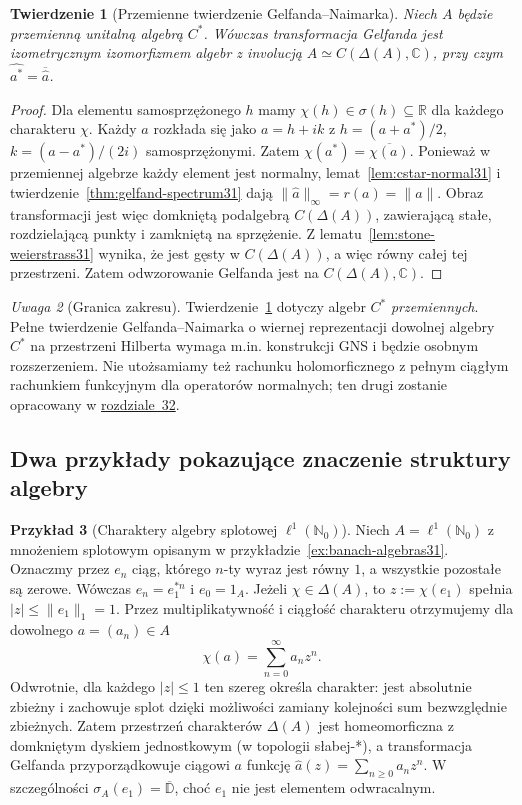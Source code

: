 \documentclass[11pt,a4paper]{article}
\numberwithin{equation}{section}
\theoremstyle{plain}
\newtheorem{twierdzenie}{Twierdzenie}[section]
\theoremstyle{definition}
\newtheorem{przyklad}[twierdzenie]{Przykład}
\theoremstyle{remark}
\newtheorem{uwaga}[twierdzenie]{Uwaga}
\newcommand{\R}{\mathbb R}
\newcommand{\C}{\mathbb C}
\newcommand{\N}{\mathbb N}
\begin{document}
\begin{twierdzenie}[Przemienne twierdzenie Gelfanda--Naimarka]
\label{thm:commutative-cstar31}
Niech $A$ będzie przemienną unitalną algebrą $C^*$.
Wówczas transformacja Gelfanda jest izometrycznym izomorfizmem
algebr z involucją
$A\simeq C(\Delta(A),\C)$,
przy czym $\widehat{a^*}=\overline{\widehat a}$.
\end{twierdzenie}
\begin{proof}
Dla elementu samosprzężonego $h$ mamy
$\chi(h)\in\sigma(h)\subseteq\R$ dla każdego charakteru $\chi$.
Każdy $a$ rozkłada się jako $a=h+ik$ z
$h=(a+a^*)/2$, $k=(a-a^*)/(2i)$ samosprzężonymi.
Zatem $\chi(a^*)=\overline{\chi(a)}$.
Ponieważ w przemiennej algebrze każdy element jest normalny,
lemat~\ref{lem:cstar-normal31} i twierdzenie~\ref{thm:gelfand-spectrum31}
dają $\|\widehat a\|_\infty=r(a)=\|a\|$.
Obraz transformacji jest więc domkniętą podalgebrą $C(\Delta(A))$,
zawierającą stałe, rozdzielającą punkty i zamkniętą na sprzężenie.
Z lematu~\ref{lem:stone-weierstrass31} wynika,
że jest gęsty w $C(\Delta(A))$, a więc równy całej tej przestrzeni.
Zatem odwzorowanie Gelfanda jest na $C(\Delta(A),\C)$.
\end{proof}

\begin{uwaga}[Granica zakresu]
Twierdzenie~\ref{thm:commutative-cstar31} dotyczy algebr $C^*$
\emph{przemiennych}. Pełne twierdzenie Gelfanda--Naimarka o
wiernej reprezentacji dowolnej algebry $C^*$ na przestrzeni Hilberta
wymaga m.in. konstrukcji GNS i będzie osobnym rozszerzeniem.
Nie utożsamiamy też rachunku holomorficznego z pełnym
ciągłym rachunkiem funkcyjnym dla operatorów normalnych;
ten drugi zostanie opracowany w \hyperref[sec:spectral-hilbert32]{rozdziale~32}.
\end{uwaga}


\subsection{Dwa przykłady pokazujące znaczenie struktury algebry}

\begin{przyklad}[Charaktery algebry splotowej $\ell^1(\N_0)$]
\label{ex:l1-characters31}
Niech $A=\ell^1(\N_0)$ z mnożeniem splotowym opisanym
w przykładzie~\ref{ex:banach-algebras31}. Oznaczmy przez $e_n$ ciąg,
którego $n$-ty wyraz jest równy $1$, a wszystkie pozostałe są zerowe.
Wówczas $e_n=e_1^{*n}$ i $e_0=1_A$.
Jeżeli $\chi\in\Delta(A)$, to $z:=\chi(e_1)$ spełnia
$|z|\le\|e_1\|_1=1$. Przez multiplikatywność i ciągłość charakteru
otrzymujemy dla dowolnego $a=(a_n)\in A$
\[
 \chi(a)=\sum_{n=0}^\infty a_nz^n.
\]
Odwrotnie, dla każdego $|z|\le1$ ten szereg określa charakter:
jest absolutnie zbieżny i zachowuje splot dzięki możliwości zamiany
kolejności sum bezwzględnie zbieżnych. Zatem przestrzeń charakterów
$\Delta(A)$ jest homeomorficzna z domkniętym dyskiem jednostkowym
(w topologii słabej-*), a transformacja Gelfanda przyporządkowuje
ciągowi $a$ funkcję $\widehat a(z)=\sum_{n\ge0}a_nz^n$.
W szczególności $\sigma_A(e_1)=\overline{\mathbb D}$,
choć $e_1$ nie jest elementem odwracalnym.
\end{przyklad}
\end{document}
